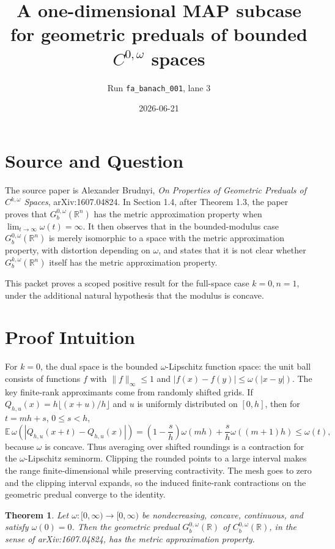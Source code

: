 \documentclass[11pt]{article}
\title{A one-dimensional MAP subcase for geometric preduals of bounded
\texorpdfstring{\(C^{0,\omega}\)}{C0omega} spaces}
\author{Run \texttt{fa\_banach\_001}, lane 3}
\date{2026-06-21}
\newtheorem{theorem}{Theorem}
\newcommand{\R}{\mathbb R}
\newcommand{\Gb}{G_b^{0,\omega}}
\begin{document}
\maketitle

\section*{Source and Question}

The source paper is Alexander Brudnyi, \emph{On Properties of Geometric
Preduals of \(C^{k,\omega}\) Spaces}, arXiv:1607.04824.  In Section 1.4,
after Theorem 1.3, the paper proves that \(\Gb(\R^n)\) has the metric
approximation property when \(\lim_{t\to\infty}\omega(t)=\infty\).  It then
observes that in the bounded-modulus case \(\Gb(\R^n)\) is merely isomorphic
to a space with the metric approximation property, with distortion depending
on \(\omega\), and states that it is not clear whether
\(G_b^{k,\omega}(\R^n)\) itself has the metric approximation property.

This packet proves a scoped positive result for the full-space case
\(k=0,n=1\), under the additional natural hypothesis that the modulus is
concave.

\section*{Proof Intuition}

For \(k=0\), the dual space is the bounded \(\omega\)-Lipschitz function
space: the unit ball consists of functions \(f\) with
\(\|f\|_\infty\le 1\) and
\(|f(x)-f(y)|\le \omega(|x-y|)\).  The key finite-rank approximants come from
randomly shifted grids.  If \(Q_{h,u}(x)=h\lfloor (x+u)/h\rfloor\) and
\(u\) is uniformly distributed on \([0,h]\), then for
\(t=mh+s\), \(0\le s<h\),
\[
 \mathbb E\,\omega(|Q_{h,u}(x+t)-Q_{h,u}(x)|)
 =
 \left(1-\frac{s}{h}\right)\omega(mh)
 + \frac{s}{h}\omega((m+1)h)
 \le \omega(t),
\]
because \(\omega\) is concave.  Thus averaging over shifted roundings is a
contraction for the \(\omega\)-Lipschitz seminorm.  Clipping the rounded
points to a large interval makes the range finite-dimensional while preserving
contractivity.  The mesh goes to zero and the clipping interval expands, so
the induced finite-rank contractions on the geometric predual converge to the
identity.

\begin{theorem}
Let \(\omega:[0,\infty)\to[0,\infty)\) be nondecreasing, concave, continuous,
and satisfy \(\omega(0)=0\).  Then the geometric predual
\(G_b^{0,\omega}(\R)\) of \(C_b^{0,\omega}(\R)\), in the sense of
arXiv:1607.04824, has the metric approximation property.
\end{theorem}
\end{document}
